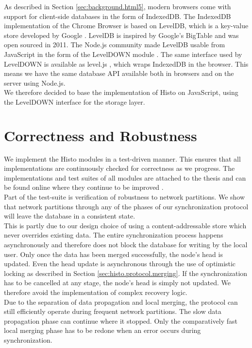 As described in Section \ref{sec:background.html5}, modern browsers come with support for client-side databases in the form of IndexedDB.
The IndexedDB implementation of the Chrome Browser is based on LevelDB, which is a key-value store developed by Google \cite{leveldb}.
LevelDB is inspired by Google's BigTable \cite{chang2008bigtable} and was open sourced in 2011.
The Node.js community made LevelDB usable from JavaScript in the form of the LevelDOWN module \cite{leveldown}.
The same interface used by LevelDOWN is available as level.js \cite{leveljs}, which wraps IndexedDB in the browser.
This means we have the same database API available both in browsers and on the server using Node.js.\\
We therefore decided to base the implementation of Histo on JavaScript, using the LevelDOWN interface for the storage layer.

\section{Correctness and Robustness}
We implement the Histo modules in a test-driven manner.
This ensures that all implementations are continuously checked for correctness as we progress.
The implementations and test suites of all modules are attached to the thesis and can be found online where they continue to be improved \cite{histo-source}.\\

Part of the test-suite is verification of robustness to network partitions.
We show that network partitions through any of the phases of our synchronization protocol will leave the database in a consistent state.\\
This is partly due to our design choice of using a content-addressable store which never overrides existing data.
The entire synchronization process happens asynchronously and therefore does not block the database for writing by the local user.
Only once the data has been merged successfully, the node's head is updated.
Even the head update is asynchronous through the use of optimistic locking as described in Section \ref{sec:histo.protocol.merging}.
If the synchronization has to be cancelled at any stage, the node's head is simply not updated.
We therefore avoid the implementation of complex recovery logic.\\
Due to the separation of data propagation and local merging, the protocol can still efficiently operate during frequent network partitions.
The slow data propagation phase can continue where it stopped.
Only the comparatively fast local merging phase has to be redone when an error occurs during synchronization.

